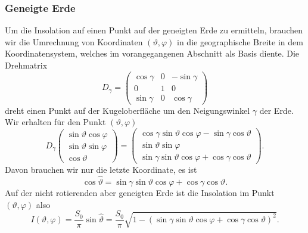 \subsubsection{Geneigte Erde}
Um die Insolation auf einen Punkt auf der geneigten Erde zu ermitteln,
brauchen wir die Umrechnung von Koordinaten $(\vartheta,\varphi)$ 
in die geographische Breite in dem Koordinatensystem, welches im
vorangegangenen Abschnitt als Basis diente.
Die Drehmatrix
\[
D_\gamma
=
\begin{pmatrix}
\cos\gamma&0&-\sin\gamma\\
0&1&0\\
\sin\gamma&0&\cos\gamma
\end{pmatrix}
\]
dreht einen Punkt auf der Kugeloberfläche um den Neigungswinkel
$\gamma$ der Erde.
Wir erhalten für den Punkt $(\vartheta,\varphi)$
\[
D_\gamma\begin{pmatrix}
\sin\vartheta\cos\varphi\\
\sin\vartheta\sin\varphi\\
\cos\vartheta
\end{pmatrix}
=
\begin{pmatrix}
\cos\gamma\sin\vartheta\cos\varphi -\sin\gamma\cos\vartheta\\
\sin\vartheta\sin\varphi\\
\sin\gamma\sin\vartheta\cos\varphi + \cos\gamma\cos\vartheta
\end{pmatrix}.
\]
Davon brauchen wir nur die letzte Koordinate, es ist
\begin{equation}
\cos\hat\vartheta
=
\sin\gamma\sin\vartheta\cos\varphi+\cos\gamma\cos\vartheta.
\end{equation}
Auf der nicht rotierenden aber geneigten Erde ist die Insolation
im Punkt $(\vartheta,\varphi)$ also
\begin{equation}
I(\vartheta,\varphi)
=
\frac{S_0}{\pi}
\sin\hat\vartheta
=
\frac{S_0}{\pi}
\sqrt{1-
(\sin\gamma\sin\vartheta\cos\varphi+\cos\gamma\cos\vartheta)^2}.
\label{skript:chapter:inspunkt}
\end{equation}


